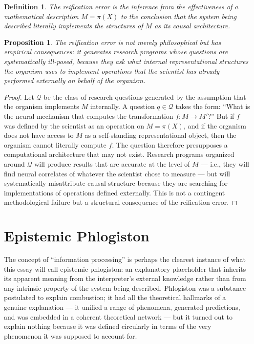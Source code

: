 \documentclass[12pt,a4paper]{report}
\theoremstyle{flyxion}
\newtheorem{proposition}[theorem]{Proposition}
\newtheorem{definition}[theorem]{Definition}
\begin{document}
\begin{definition}
The \emph{reification error} is the inference from the effectiveness of a mathematical description $M = \pi(X)$ to the conclusion that the system being described literally implements the structures of $M$ as its causal architecture.
\end{definition}

\begin{proposition}
The reification error is not merely philosophical but has empirical consequences: it generates research programs whose questions are systematically ill-posed, because they ask what internal representational structures the organism uses to implement operations that the scientist has already performed externally on behalf of the organism.
\end{proposition}

\begin{proof}
Let $\mathcal{Q}$ be the class of research questions generated by the assumption that the organism implements $M$ internally. A question $q \in \mathcal{Q}$ takes the form: ``What is the neural mechanism that computes the transformation $f : M \rightarrow M'$?'' But if $f$ was defined by the scientist as an operation on $M = \pi(X)$, and if the organism does not have access to $M$ as a self-standing representational object, then the organism cannot literally compute $f$. The question therefore presupposes a computational architecture that may not exist. Research programs organized around $\mathcal{Q}$ will produce results that are accurate at the level of $M$ --- i.e., they will find neural correlates of whatever the scientist chose to measure --- but will systematically misattribute causal structure because they are searching for implementations of operations defined externally. This is not a contingent methodological failure but a structural consequence of the reification error.
\end{proof}

\section{Epistemic Phlogiston}

The concept of ``information processing'' is perhaps the clearest instance of what this essay will call epistemic phlogiston: an explanatory placeholder that inherits its apparent meaning from the interpreter's external knowledge rather than from any intrinsic property of the system being described. Phlogiston was a substance postulated to explain combustion; it had all the theoretical hallmarks of a genuine explanation --- it unified a range of phenomena, generated predictions, and was embedded in a coherent theoretical network --- but it turned out to explain nothing because it was defined circularly in terms of the very phenomenon it was supposed to account for.
\end{document}
